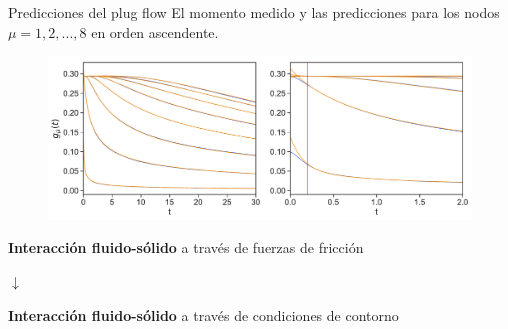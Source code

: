 \documentclass{beamer}
\begin{document}
\begin{frame}{Predicciones del plug flow}
      El {\color{blue} momento medido} y las {\color{orange} predicciones} para los nodos $\mu=1, 2,...,8$ en orden ascendente.
\begin{figure}[!h]
\includegraphics[width=\linewidth]{gxtPredictions-17nodes-WALLS-defense2}
\end{figure}
\end{frame}


\begin{frame}
  \textbf{Interacción fluido-sólido} a través de \alert{fuerzas de fricción} \\ 
  \begin{center}
  $\downarrow$ \\
  \end{center}
  \textbf{Interacción fluido-sólido} a través de \alert{condiciones de contorno}
\end{frame}
\end{document}

